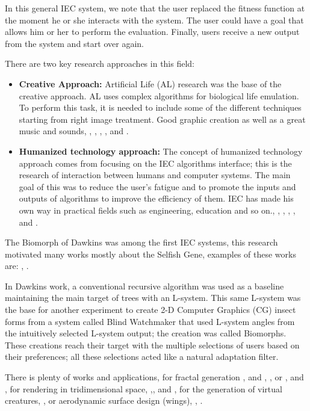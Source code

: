 In this general IEC system, we note that the user replaced the fitness function
at the moment he or she interacts with the system. The user could have a goal
that allows him or her to perform the evaluation. Finally, users receive a new
output from the system and start over again.

There are two key research approaches in this field:

\begin{itemize} \item \textbf{Creative Approach:} Artificial Life (AL) research
was the base of the creative approach. AL uses complex algorithms for biological
life emulation. To perform this task, it is needed to include some of the
different techniques starting from right image treatment. Good graphic creation
as well as a great music and sounds, \cite{sims1991artificial},
\cite{sims1994evolving}, \cite{dawkins1986blind}, \cite{disz1997ubiworld},
\cite{unemi2000sbart}and \cite{unemi2003sbeat3}. \item \textbf{Humanized
technology approach:} The concept of humanized technology approach comes from
focusing on the IEC algorithms interface; this is the research of interaction
between humans and computer systems. The main goal of this was to reduce the
user's fatigue and to promote the inputs and outputs of algorithms to improve
the efficiency of them. IEC has made his own way in practical fields such as
engineering, education and so on., \cite{parmee1993concrete},
\cite{ventrella1994explorations}, \cite{takagi1996discrete},
\cite{poli1997genetic}, \cite{parmee1998genetic} and
\cite{takagi1998interactive}. \end{itemize}

The Biomorph of Dawkins was among the first IEC systems,
this research motivated many works mostly about the Selfish Gene, examples
of these works are: \cite{ochoa1998genetic},
\cite{mccormack1993interactive}.

In Dawkins work, a conventional recursive algorithm was used as a baseline
maintaining the main target of trees with an L-system. This same L-system was
the base for another experiment to create 2-D Computer Graphics (CG) insect
forms from a system called Blind Watchmaker that used L-system angles from the
intuitively selected L-system output; the creation was called Biomorphs. These
creations reach their target with the multiple selections of users based on
their preferences; all these selections acted like a natural adaptation filter.

There is plenty of works and applications, for fractal generation
\cite{sims1992interactive}, \cite{baluja1993simulating} and
\cite{baluja1994towards}, \cite{lund1995artistic}, or
\cite{angeline1996evolving},\cite{raynal1999manipulation} and \cite{lutton2003artie},
for rendering in tridimensional space,
\cite{todd1992artificial},\cite{broughton1997use}, \cite{das1994genetic} and \cite{tam2002genetic}, for the generation of virtual creatures,
\cite{rowland2000evolutionary}, or aerodynamic surface design (wings),
\cite{nguyen1993evolvable}, \cite{nguyen1994evolvable}.

